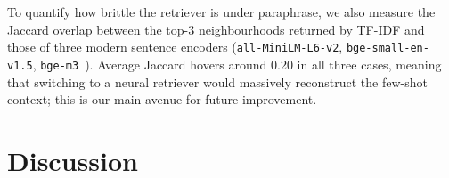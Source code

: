 \documentclass[]{ceurart}
\begin{document}
To quantify how brittle the retriever is under paraphrase, we also measure the Jaccard overlap between the top-3 neighbourhoods returned by TF-IDF and those of three modern sentence encoders (\texttt{all-MiniLM-L6-v2}, \texttt{bge-small-en-v1.5}, \texttt{bge-m3}~\cite{chen2024bge}). Average Jaccard hovers around 0.20 in all three cases, meaning that switching to a neural retriever would massively reconstruct the few-shot context; this is our main avenue for future improvement.

\section{Discussion}
\label{sec:discussion}
\end{document}
